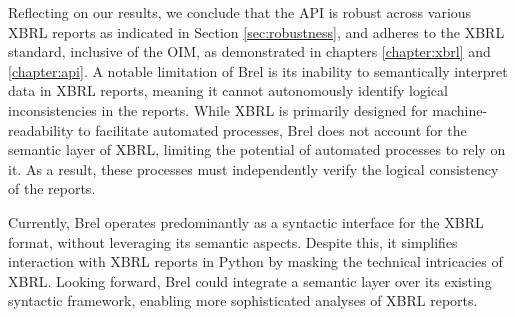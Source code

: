 Reflecting on our results, we conclude that the API is robust across various XBRL reports
as indicated in Section \ref{sec:robustness},
and adheres to the XBRL standard, inclusive of the OIM,
as demonstrated in chapters \ref{chapter:xbrl} and \ref{chapter:api}.
A notable limitation of Brel is its inability to semantically interpret data in XBRL reports,
meaning it cannot autonomously identify logical inconsistencies in the reports.
While XBRL is primarily designed for machine-readability to facilitate automated processes,
Brel does not account for the semantic layer of XBRL, limiting the potential of automated processes to rely on it.
As a result, these processes must independently verify the logical consistency of the reports.

Currently, Brel operates predominantly as a syntactic interface for the XBRL format, without leveraging its semantic aspects.
Despite this, it simplifies interaction with XBRL reports in Python by masking the technical intricacies of XBRL.
Looking forward, Brel could integrate a semantic layer over its existing syntactic framework, enabling more sophisticated analyses of XBRL reports.


